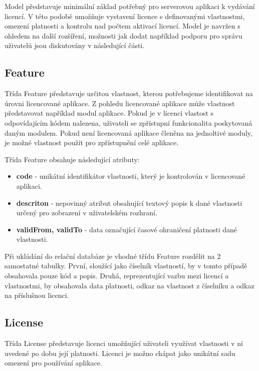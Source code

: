 Model představuje minimální základ potřebný pro serverovou aplikaci k vydávání
licencí. V této podobě umožňuje vystavení licence s definovanými vlastnostmi,
omezení platnosti a kontrolu nad počtem aktivací licencí. Model je navržen s
ohledem na další rozšíření, možnosti jak dodat například podporu pro správu
uživatelů jsou diskutovány v následující části.


\subsection*{Feature}

Třída Feature představuje určitou vlastnost, kterou potřebujeme identifikovat na
úrovni licencované aplikace. Z pohledu licencované aplikace může vlastnost
představovat například modul aplikace. Pokud je v licenci vlastost s
odpovídajícím kódem nalezena, uživateli se zpřístupní funkcionalita poskytovaná
daným modulem. Pokud není licencovaná aplikace členěna na jednoltivé moduly, je
možné vlastnost použít pro zpřístupnění celé aplikace.

Třída Feature obsahuje následující atributy:

\begin{itemize}
  \item \textbf{code} - unikátní identifikátor vlastnosti, který je kontrolován
  v licencované aplikaci.
  \item \textbf{descriton} - nepovinný atribut obsahující textový popis k dané
  vlastnosti určený pro zobrazení v uživatelském rozhraní.
  \item \textbf{validFrom, validTo} - data označující časové ohraničení
  platnosti dané vlastnosti.
\end{itemize}

Při ukládání do relační databáze je vhodné třídu Feature rozdělit na 2
samostatné tabulky. První, sloužící jako číselník vlastností, by v tomto případě
obsahovala pouze kód a popis. Druhá, reprezentující vazbu mezi
licencí a vlastnostmi, by obsahovala data platnosti, odkaz na vlastnost z
číselníku a odkaz na příslušnou licenci. 

\subsection*{License}

Třída License představuje licenci umožňující uživateli využívat vlastnosti v ní
uvedené po dobu její platnosti. Licenci je možno chápat jako unikátní sadu
omezení pro používání aplikace. 

